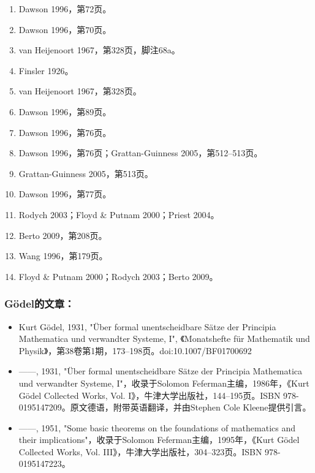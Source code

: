 \begin{enumerate}
\item Dawson 1996，第72页。
\item Dawson 1996，第70页。
\item van Heijenoort 1967，第328页，脚注68a。
\item Finsler 1926。
\item van Heijenoort 1967，第328页。
\item Dawson 1996，第89页。
\item Dawson 1996，第76页。
\item Dawson 1996，第76页；Grattan-Guinness 2005，第512–513页。
\item Grattan-Guinness 2005，第513页。
\item Dawson 1996，第77页。
\item Rodych 2003；Floyd & Putnam 2000；Priest 2004。
\item Berto 2009，第208页。
\item Wang 1996，第179页。
\item Floyd & Putnam 2000；Rodych 2003；Berto 2009。
\end{enumerate}
\subsubsection{Gödel的文章：}
\begin{itemize}
\item Kurt Gödel, 1931, "Über formal unentscheidbare Sätze der Principia Mathematica und verwandter Systeme, I", 《Monatshefte für Mathematik und Physik》，第38卷第1期，173–198页。doi:10.1007/BF01700692
\item ——, 1931, "Über formal unentscheidbare Sätze der Principia Mathematica und verwandter Systeme, I"，收录于Solomon Feferman主编，1986年，《Kurt Gödel Collected Works, Vol. I》，牛津大学出版社，144–195页。ISBN 978-0195147209。原文德语，附带英语翻译，并由Stephen Cole Kleene提供引言。
\item ——, 1951, "Some basic theorems on the foundations of mathematics and their implications"，收录于Solomon Feferman主编，1995年，《Kurt Gödel Collected Works, Vol. III》，牛津大学出版社，304–323页。ISBN 978-0195147223。
\end{itemize}
